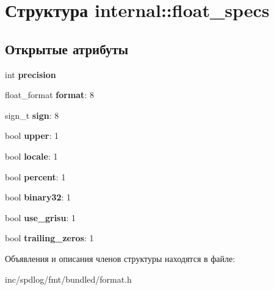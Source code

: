 \hypertarget{structinternal_1_1float__specs}{}\section{Структура internal\+:\+:float\+\_\+specs}
\label{structinternal_1_1float__specs}
\subsection*{Открытые атрибуты}
\begin{DoxyCompactItemize}
\item 
\mbox{\label{structinternal_1_1float__specs_a80f5da3076233a0ab1cd078f969fabde}} 
int {\bfseries precision}
\item 
\mbox{\label{structinternal_1_1float__specs_ae1004f3b00fc08c9af7c08d39ec2e47d}} 
float\+\_\+format {\bfseries format}\+: 8
\item 
\mbox{\label{structinternal_1_1float__specs_a14225acfc8f65007ef7f2f362344db68}} 
sign\+\_\+t {\bfseries sign}\+: 8
\item 
\mbox{\label{structinternal_1_1float__specs_afa02ccdeb6fd148effc868f606df9b90}} 
bool {\bfseries upper}\+: 1
\item 
\mbox{\label{structinternal_1_1float__specs_a0b270d3244abe78e6d7f94e03d87effc}} 
bool {\bfseries locale}\+: 1
\item 
\mbox{\label{structinternal_1_1float__specs_ad7e065ec5ab0320a9745b6da2289a959}} 
bool {\bfseries percent}\+: 1
\item 
\mbox{\label{structinternal_1_1float__specs_aecde387b11daf8ef3a300465e448af80}} 
bool {\bfseries binary32}\+: 1
\item 
\mbox{\label{structinternal_1_1float__specs_a7beb1ebcee9b20a57b68bfaa02a52bf3}} 
bool {\bfseries use\+\_\+grisu}\+: 1
\item 
\mbox{\label{structinternal_1_1float__specs_a4b8a5546dcc2aaecb5580c8a87a6bf4e}} 
bool {\bfseries trailing\+\_\+zeros}\+: 1
\end{DoxyCompactItemize}


Объявления и описания членов структуры находятся в файле\+:\begin{DoxyCompactItemize}
\item 
inc/spdlog/fmt/bundled/format.\+h\end{DoxyCompactItemize}
